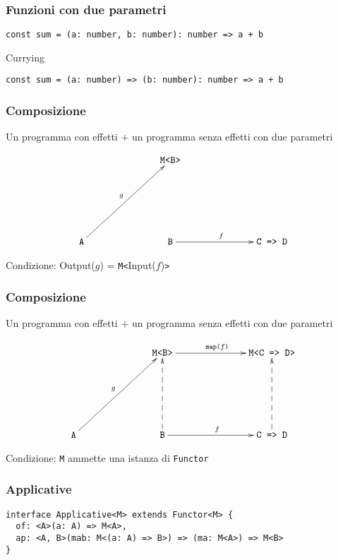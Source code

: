 \documentclass{beamer}
\begin{document}
\begin{frame}[fragile]
\frametitle{Funzioni con due parametri}

\begin{example}
\begin{verbatim}
const sum = (a: number, b: number): number => a + b
\end{verbatim}
\end{example}

Currying

\begin{example}
\begin{verbatim}
const sum = (a: number) => (b: number): number => a + b
\end{verbatim}
\end{example}

\end{frame}

\begin{frame}
\frametitle{Composizione}

Un programma con effetti + un programma senza effetti con due parametri

\[
\xymatrixrowsep{2.5cm}
\xymatrixcolsep{2.5cm}
\xymatrix{
  & \texttt{M<B>} \\
  \texttt{A} \ar[ur]^{g} & \texttt{B} \ar[r]^{f} & \texttt{C => D}
}
\]

Condizione: Output($g$) = \texttt{M<}Input($f$)\texttt{>}

\end{frame}

\begin{frame}
\frametitle{Composizione}

Un programma con effetti + un programma senza effetti con due parametri

\[
\xymatrixrowsep{2.5cm}
\xymatrixcolsep{2.5cm}
\xymatrix{
  & \texttt{M<B>} \ar[r]^{\texttt{map(}f\texttt{)}} & \texttt{M<C => D>} \\
  \texttt{A} \ar[ur]^{g} & \texttt{B} \ar[r]^{f} \ar@{-->}[u] & \texttt{C => D} \ar@{-->}[u]
}
\]

Condizione: \texttt{M} ammette una istanza di \texttt{Functor}

\end{frame}

\begin{frame}[fragile]
\frametitle{Applicative}

\begin{verbatim}
interface Applicative<M> extends Functor<M> {
  of: <A>(a: A) => M<A>,
  ap: <A, B>(mab: M<(a: A) => B>) => (ma: M<A>) => M<B>
}
\end{verbatim}

\end{frame}
\end{document}
